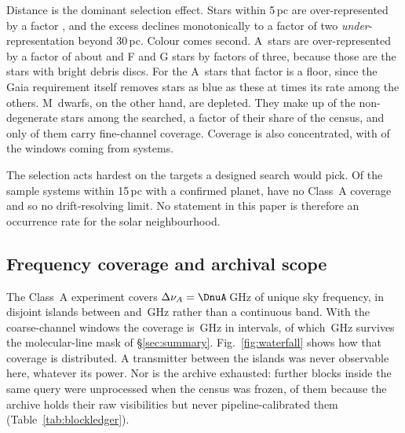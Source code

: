 Distance is the dominant selection effect. Stars within 5\,pc are
over-represented by a factor \SfTopRatio, and the excess declines
monotonically to a factor of two \emph{under}-representation beyond 30\,pc. Colour comes
second. A~stars are over-represented by a factor of about \SfARatio{} and F and G stars
by factors of three, because those are the stars with bright debris discs.
For the A~stars that factor is a floor, since the Gaia requirement
itself removes stars as blue as these at \BsEarlyRatio{} times its rate among
the others. M~dwarfs, on the other hand, are depleted. They make up
\SfMSearched{} of the \SfNMain{} non-degenerate stars among the \SfNStar{}
searched, a factor \SfMRatio{} of their share of the census, and only
\SfMClassAStars{} of them carry fine-channel coverage. Coverage is also concentrated, with
\ConcThreeWin{} of the \NWindows{} windows coming from \ConcThreeSys{}
systems.

The selection acts hardest on the targets a designed search would pick. Of
the \CsIntNRow{} sample systems within 15\,pc with a confirmed planet,
\CsIntNoClassA{} have no Class~A coverage and so no drift-resolving limit.
No statement in this paper is therefore an occurrence rate for the solar
neighbourhood.



\subsection{Frequency coverage and archival scope}
\label{sec:coverage}

The Class~A experiment covers $\Delta\nu_A=\DnuA$\,GHz of unique sky
frequency, in \DomAIslands{} disjoint islands between \DomAFreqLo{} and
\DomAFreqHi\,GHz rather than a continuous band. With the coarse-channel
windows the coverage is \DnuAB\,GHz in \UnionIntervals{} intervals, of which
\SearchedUnionGHz\,GHz survives the molecular-line mask of
\S\ref{sec:summary}. Fig.~\ref{fig:waterfall} shows how that coverage is
distributed. A transmitter between the islands was never observable here,
whatever its power. Nor is the archive exhausted: \LdgExtScope{} further
blocks inside the same query were unprocessed when the census was frozen,
\FateNoCal{} of them because the archive holds their raw visibilities but
never pipeline-calibrated them (Table~\ref{tab:blockledger}).

